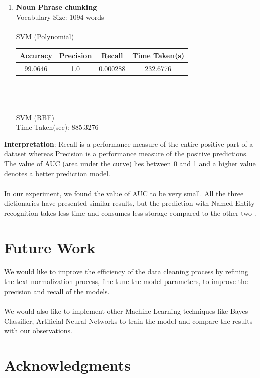 \documentclass[fleqn,10pt]{SelfArx} %
\begin{document}
\begin{enumerate}
\item\textbf{Noun Phrase chunking}
\\Vocabulary Size: 1094 words
\\\\SVM (Polynomial)
\\ \begin{tabular}{|c c c c|} 
\hline
Accuracy & Precision & Recall & Time Taken(s)\\ \hline
99.0646 & 1.0 & 0.000288 & 232.6776 \\ \hline
\end{tabular}
\\\\\\SVM (RBF)
\\Time Taken(sec): 885.3276
\end{enumerate}

\textbf{Interpretation}: Recall is a performance measure of the entire positive part of a dataset whereas Precision is a performance measure of the positive predictions. The value of AUC (area under the curve) lies between 0 and 1 and a higher value denotes a better prediction model.
\\\\In our experiment, we found the value of AUC to be very small. All the three dictionaries have presented similar results, but the prediction with Named Entity recognition takes less time and consumes less storage compared to the other two \cite{REF:7}.

\section{Future Work}
We would like to improve the efficiency of the data cleaning process by refining the text normalization process, fine tune the model parameters, to improve the precision and recall of the models.
\\\\We would also like to implement other Machine Learning techniques like Bayes Classifier, Artificial Neural Networks to train the model and compare the results with our observations.

\section*{Acknowledgments} %
\end{document}
